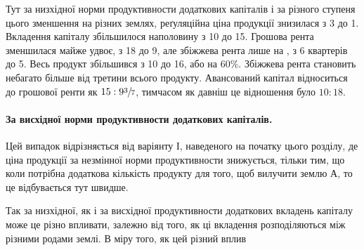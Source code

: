 \noindent{}Тут за низхідної норми продуктивности додаткових капіталів і за різного
ступеня цього зменшення на різних землях, реґуляційна ціна продукції знизилася
з 3 до 1. Вкладення капіталу збільшилося наполовину з 10 до 15. Грошова рента зменшилася майже удвоє, з 18 до 9, але збіжжева рента лише на ,
з 6 квартерів до 5. Весь продукт
збільшився з 10 до 16, або на 60\%.
Збіжжева рента становить небагато більше
від третини всього продукту. Авансований капітал відноситься до грошової ренти
як $15 : 9\sfrac{3}{7}$, тимчасом як давніш це відношення було $10:18$.

\paragraph{За висхідної норми продуктивности додаткових капіталів.}

Цей випадок відрізняється від варіянту І, наведеного на початку цього
розділу, де ціна продукції за незмінної норми продуктивности знижується, тільки
тим, що коли потрібна додаткова кількість продукту для того, щоб вилучити
землю $А$, то це відбувається тут швидше.

Так за низхідної, як і за висхідної продуктивности додаткових вкладень
капіталу може це різно впливати, залежно від того, як ці вкладення розподіляються
між різними родами землі. В міру того, як цей різний вплив
\parbreak{}  %
